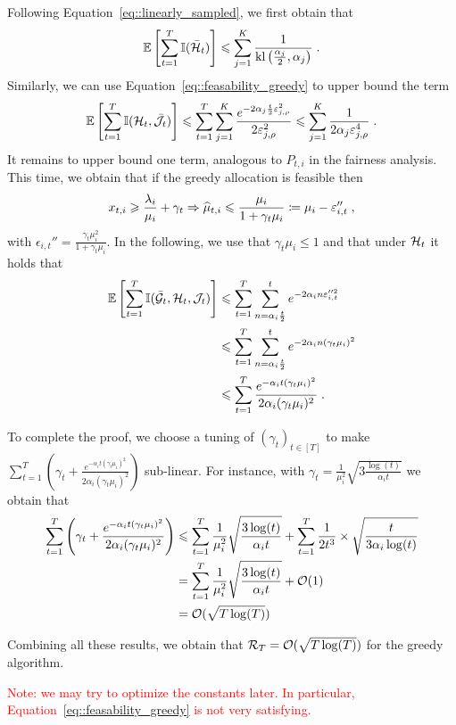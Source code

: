 Following Equation~\eqref{eq::linearly_sampled}, we first obtain that 
\[\mathbb{E}\left[\sum_{t=1}^T \mathbb{I}(\bar{\mathcal{H}}_t)\right] \leqslant \sum_{j=1}^K \frac{1}{\text{\normalfont kl}\left(\frac{\alpha_j}{2}, \alpha_j\right)} \;. \]
Similarly, we can use Equation~\eqref{eq::feasability_greedy} to upper bound the term
\[ \mathbb{E}\left[\sum_{t=1}^T \mathbb{I}(\mathcal{H}_t, \bar {\mathcal{J}}_t)\right] \leqslant \sum_{t=1}^T \sum_{j=1}^K \frac{e^{-2\alpha_j \frac{t}{2} \varepsilon_{j, \rho}^2}}{2\varepsilon_{j, \rho}^2}\leqslant \sum_{j=1}^K \frac{1}{2 \alpha_j \varepsilon_{j, \rho}^4} \;. \]
It remains to upper bound one term, analogous to $P_{t,i}$ in the fairness analysis. This time, we obtain that if the greedy allocation is feasible then
\[x_{t,i}\geqslant \frac{\lambda_i}{\mu_i}+ \gamma_t \Rightarrow \widehat{\mu}_{t,i} \leqslant \frac{\mu_i}{1+\gamma_t \mu_i} \coloneqq \mu_i - \varepsilon_{i,t}''\;, \]
with $\epsilon_{i,t}''=\frac{\gamma_t \mu_i^2}{1+\gamma_t \mu_i}$. In the following, we use that $\gamma_t \mu_i \leq 1$ and that under $\mathcal{H}_t$ it holds that 
\begin{align*}
\mathbb{E}\left[\sum_{t=1}^T \mathbb{I}(\bar {\mathcal{G}}_t, \mathcal{H}_t, \mathcal{J}_t)\right] &\leqslant \sum_{t=1}^T \sum_{n=\alpha_i \frac{t}{2}}^t e^{-2\alpha_i n \varepsilon_{i,t}''^2} \\
& \leqslant \sum_{t=1}^T \sum_{n=\alpha_i \frac{t}{2}}^t e^{-2\alpha_i n (\gamma_t \mu_i)^2}\\
& \leqslant \sum_{t=1}^T \frac{e^{-\alpha_i t (\gamma_t \mu_i)^2}}{2\alpha_i (\gamma_t \mu_i)^2} \;.
\end{align*}

To complete the proof, we choose a tuning of $(\gamma_t)_{t\in[T]}$ to make $\sum_{t=1}^T \left(\gamma_t + \frac{e^{-\alpha_i t (\gamma_t \mu_i)^2}}{2\alpha_i (\gamma_t \mu_i)^2}\right)$ sub-linear. For instance, with $\gamma_t=\frac{1}{\mu_i^2}\sqrt{3\frac{\log(t)}{\alpha_i t}}$ we obtain that 
\begin{align*}\sum_{t=1}^T \left(\gamma_t + \frac{e^{-\alpha_i t (\gamma_t \mu_i)^2}}{2\alpha_i (\gamma_t \mu_i)^2}\right) & \leqslant \sum_{t=1}^T\frac{1}{\mu_i^2}\sqrt{\frac{3\log(t)}{\alpha_i t}} + \sum_{t=1}^T \frac{1}{2 t^3}\times \sqrt{\frac{t}{3\alpha_i\log(t)}} \\
& = \sum_{t=1}^T\frac{1}{\mu_i^2}\sqrt{\frac{3\log(t)}{\alpha_i t}} + \mathcal{O}(1)  \\
& = \mathcal{O}(\sqrt{T\log(T)})
\end{align*}

Combining all these results, we obtain that $\mathcal{R}_T = \mathcal{O}(\sqrt{T\log(T)})$ for the greedy algorithm. 

\textcolor{red}{Note: we may try to optimize the constants later. In particular, Equation~\eqref{eq::feasability_greedy} is not very satisfying.}


